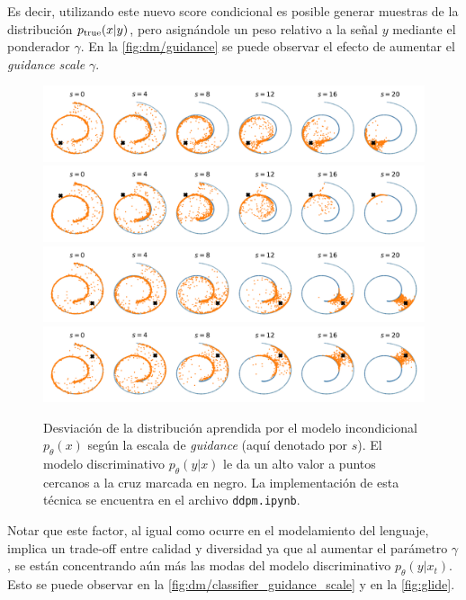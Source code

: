 Es decir, utilizando este nuevo score condicional es posible generar muestras de la distribución $p_{\operatorname{true}}(x|y)$, pero asignándole un peso relativo a la señal $y$ mediante el ponderador $\gamma$. En la \autoref{fig:dm/guidance} se puede observar el efecto de aumentar el \textit{guidance scale} $\gamma$.

\begin{figure}[!ht]
    \centering
    \includegraphics[width=\textwidth]{images/dm/guidance[-1, -1]}
    \includegraphics[width=\textwidth]{images/dm/guidance[-1, 1]}
    \includegraphics[width=\textwidth]{images/dm/guidance[1, -1]}
    \includegraphics[width=\textwidth]{images/dm/guidance[1, 1]}
    \caption{Desviación de la distribución aprendida por el modelo incondicional $p_\theta(x)$ según la escala de \textit{guidance} (aquí denotado por $s$). El modelo discriminativo $p_\theta(y|x)$ le da un alto valor a puntos cercanos a la cruz marcada en negro. La implementación de esta técnica se encuentra en el archivo \texttt{ddpm.ipynb}.}
    \label{fig:dm/guidance}
\end{figure}

Notar que este factor, al igual como ocurre en el modelamiento del lenguaje, implica un trade-off entre calidad y diversidad ya que al aumentar el parámetro $\gamma$, se están concentrando aún más las modas del modelo discriminativo $p_\theta(y|x_t)$. Esto se puede observar en la \autoref{fig:dm/classifier_guidance_scale} y en la \autoref{fig:glide}.

